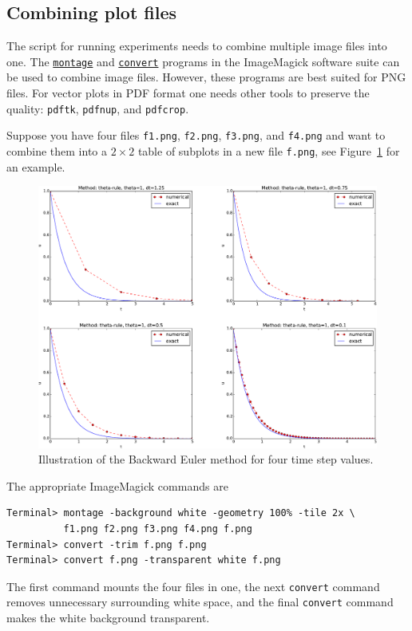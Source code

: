 \documentclass[%
oneside,                 %
final,                   %
10pt]{article}
\begin{document}
\subsection{Combining plot files}

The script for running experiments needs to combine multiple image
files into one. The
\href{{http://www.imagemagick.org/script/montage.php}}{\nolinkurl{montage}}
and
\href{{http://www.imagemagick.org/script/convert.php}}{\nolinkurl{convert}} programs in
the ImageMagick software suite
can be used to combine image files.
However, these programs are best suited for
PNG files. For vector plots in PDF format one needs other tools
to preserve the quality: \texttt{pdftk}, \texttt{pdfnup}, and \texttt{pdfcrop}.

Suppose you have four files \texttt{f1.png}, \texttt{f2.png}, \texttt{f3.png}, and \texttt{f4.png}
and want to combine them into a $2\times 2$ table of subplots in a new
file \texttt{f.png}, see
Figure~\ref{softeng1:experiments:fig:BE4a} for an example.


\begin{figure}[!ht]  %
  \centerline{\includegraphics[width=1.1\linewidth]{fig-softeng/BE.pdf}}
  \caption{
  Illustration of the Backward Euler method for four time step values. \label{softeng1:experiments:fig:BE4a}
  }
\end{figure}


The appropriate ImageMagick commands are

\begin{Verbatim}[frame=lines,label=\fbox{{\tiny Terminal}},framesep=2.5mm,framerule=0.7pt,fontsize=\fontsize{9pt}{9pt}]
Terminal> montage -background white -geometry 100% -tile 2x \ 
          f1.png f2.png f3.png f4.png f.png
Terminal> convert -trim f.png f.png
Terminal> convert f.png -transparent white f.png
\end{Verbatim}
The first command mounts the four files in one, the next \texttt{convert} command
removes unnecessary surrounding white space, and the final \texttt{convert} command
makes the white background transparent.
\end{document}
